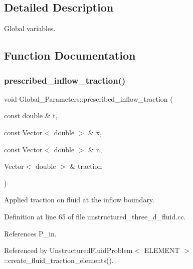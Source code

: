 \subsection{Detailed Description}
Global variables. 

\subsection{Function Documentation}
\mbox{\label{namespaceGlobal__Parameters_af7faf65214ed9ead637f7c208addb095}} 
\subsubsection{\texorpdfstring{prescribed\+\_\+inflow\+\_\+traction()}{prescribed\_inflow\_traction()}}
{\footnotesize\ttfamily void Global\+\_\+\+Parameters\+::prescribed\+\_\+inflow\+\_\+traction (\begin{DoxyParamCaption}\item[{const double \&}]{t,  }\item[{const Vector$<$ double $>$ \&}]{x,  }\item[{const Vector$<$ double $>$ \&}]{n,  }\item[{Vector$<$ double $>$ \&}]{traction }\end{DoxyParamCaption})}



Applied traction on fluid at the inflow boundary. 



Definition at line 65 of file unstructured\+\_\+three\+\_\+d\+\_\+fluid.\+cc.



References P\+\_\+in.



Referenced by Unstructured\+Fluid\+Problem$<$ E\+L\+E\+M\+E\+N\+T $>$\+::create\+\_\+fluid\+\_\+traction\+\_\+elements().

\mbox{\label{namespaceGlobal__Parameters_a83155358b144cff7e29ecb6b209a2d3e}} 
